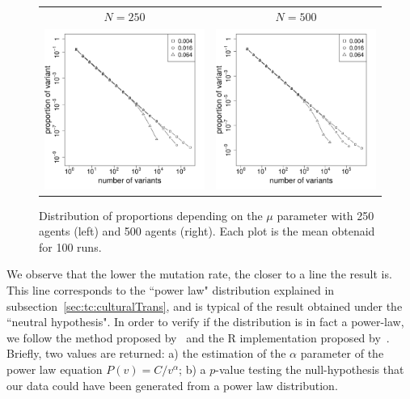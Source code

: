 \documentclass[a4paper]{article}
\begin{document}
\begin{figure}[!h]
	\centering
	\begin{tabular}{ c c}
		 $N=250$ & $N=500$ \\
		\includegraphics[width=7cm]{img/allmuRandMaxN250.pdf}&
		\includegraphics[width=7cm]{img/allmuRandMaxN500.pdf}
	\end{tabular}
	\caption{Distribution of proportions depending on the $\mu$ parameter with 250 agents (left) and 500 agents (right). Each plot is the mean obtenaid for 100 runs.\label{fig:allMutation}}
\end{figure}

We observe that the lower the mutation rate, the closer to a line the result is. This line corresponds to the ``power law" distribution explained in subsection~\ref{sec:tc:culturalTrans}, and is typical of the result obtained under the ``neutral hypothesis". In order to verify if the distribution is in fact a power-law, we follow the method proposed by~\cite{clauset2009powerlawdistributionsinempiricaldat} and the R implementation proposed by~\cite{gillespie_fitting_2015}. Briefly, two values are returned: a) the estimation of the $\alpha$ parameter of the power law equation $P(v)=C/v^\alpha $; b) a $p$-value testing the null-hypothesis that our data could have been generated from a power law distribution.
\end{document}
